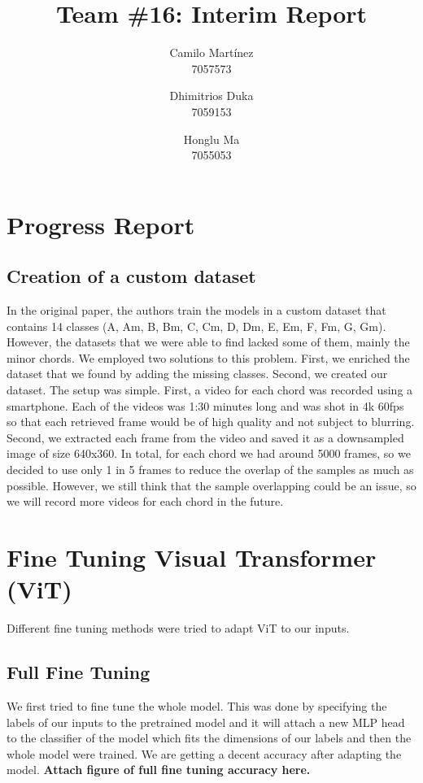 \documentclass[10pt,twocolumn,letterpaper]{article}
\begin{document}
\title{Team \#16: Interim Report} 

\author{
 Camilo Martínez\\
 7057573\\
    \and
 Dhimitrios Duka\\
 7059153\\
    \and
 Honglu Ma\\
 7055053\\
}
\maketitle

\section{Progress Report}


\subsection{Creation of a custom dataset}
In the original paper, the authors train the models in a custom dataset that contains 14 classes (A, Am, B, Bm, C, Cm, D, Dm, E, Em, F, Fm, G, Gm). However, the datasets that we were able to find lacked some of them, mainly the minor chords. We employed two solutions to this problem. First, we enriched the dataset that we found by adding the missing classes. Second, we created our dataset. The setup was simple. First, a video for each chord was recorded using a smartphone. Each of the videos was 1:30 minutes long and was shot in 4k 60fps so that each retrieved frame would be of high quality and not subject to blurring. Second, we extracted each frame from the video and saved it as a downsampled image of size 640x360. In total, for each chord we had around 5000 frames, so we decided to use only 1 in 5 frames to reduce the overlap of the samples as much as possible. However, we still think that the sample overlapping could be an issue, so we will record more videos for each chord in the future.

\section{Fine Tuning Visual Transformer (ViT)}
Different fine tuning methods were tried to adapt ViT to our inputs.
\subsection{Full Fine Tuning}
We first tried to fine tune the whole model. This was done by specifying the labels of our inputs to the pretrained model and it will attach a new MLP head to the classifier of the model which fits the dimensions of our labels and then the whole model were trained. We are getting a decent accuracy after adapting the model. \textbf{Attach figure of full fine tuning accuracy here.}
\end{document}
